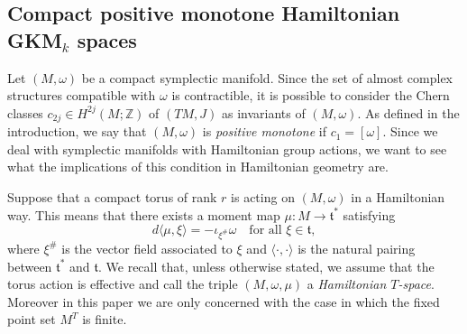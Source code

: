 \documentclass[12pt,a4paper]{amsart}
\newcommand{\ZZ}{\mathbb{Z}}
\theoremstyle{plain}
\theoremstyle{definition}
\begin{document}
\subsection{Compact positive monotone Hamiltonian GKM$_k$ spaces}
Let $(M,\omega)$ be a compact symplectic manifold. Since the set of almost complex structures compatible with
$\omega$ is contractible, it is possible to consider the Chern classes $c_{2j}\in H^{2j}(M;\ZZ)$ of $(TM,J)$ as invariants of $(M,\omega)$. 
As defined in the introduction, we say that $(M,\omega)$ is \emph{positive monotone} if $c_1=[\omega]$.
Since we deal with symplectic manifolds with Hamiltonian group actions, we want to see
what the implications of this condition
in Hamiltonian geometry are. 

Suppose that a compact torus of rank $r$ is acting on $(M,\omega)$ in a Hamiltonian way. This means that there exists a moment
map $\mu\colon M \to \mathfrak{t}^*$ satisfying
\begin{equation}\label{def moment map 2}
d\langle \mu, \xi \rangle = - \iota_{\xi^\#} \omega \quad \text{for all  }\xi \in \mathfrak{t},
\end{equation}
where $\xi^\#$ is the vector field associated to $\xi$ and $\langle \cdot , \cdot \rangle$ is the natural pairing between $\mathfrak{t}^*$ and $\mathfrak{t}$. 
We recall that, unless otherwise stated, we assume that the torus action is effective and call the triple $(M,\omega,\mu)$ a \textit{Hamiltonian $T$-space}. 
Moreover in this paper we are only concerned with the case in which the fixed point set $M^T$ is finite. 
\end{document}
